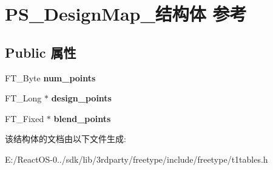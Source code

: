 \hypertarget{struct_p_s___design_map__}{}\section{P\+S\+\_\+\+Design\+Map\+\_\+结构体 参考}
\label{struct_p_s___design_map__}
\subsection*{Public 属性}
\begin{DoxyCompactItemize}
\item 
\mbox{\label{struct_p_s___design_map___a505a70dd0f497f177fffca9bc4e5d0a5}} 
F\+T\+\_\+\+Byte {\bfseries num\+\_\+points}
\item 
\mbox{\label{struct_p_s___design_map___abd7a86ba33248ceed657c31063b49679}} 
F\+T\+\_\+\+Long $\ast$ {\bfseries design\+\_\+points}
\item 
\mbox{\label{struct_p_s___design_map___a74a555fb4315fca7477f6d20d49686ec}} 
F\+T\+\_\+\+Fixed $\ast$ {\bfseries blend\+\_\+points}
\end{DoxyCompactItemize}


该结构体的文档由以下文件生成\+:\begin{DoxyCompactItemize}
\item 
E\+:/\+React\+O\+S-\/0../sdk/lib/3rdparty/freetype/include/freetype/t1tables.\+h\end{DoxyCompactItemize}
